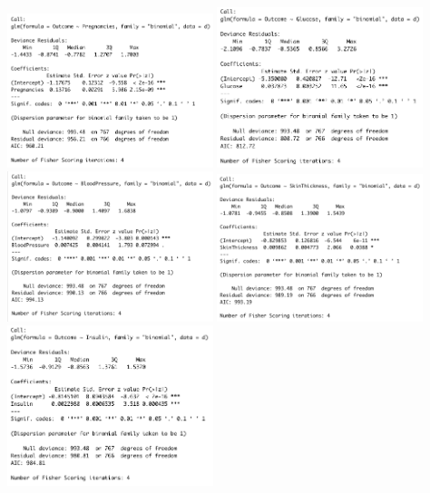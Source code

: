 \begin{center}
\includegraphics[width=0.45\textwidth]{img/cor-example-pregnancies.png}
\includegraphics[width=0.45\textwidth]{img/cor-example-glucose.png} \\[2mm]
\includegraphics[width=0.45\textwidth]{img/cor-example-bp.png}
\includegraphics[width=0.45\textwidth]{img/cor-example-skin-thickness.png} \\[2mm]
\includegraphics[width=0.45\textwidth]{img/cor-example-insulin.png}

\end{center}

